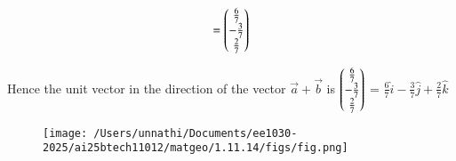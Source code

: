 \documentclass[journal]{IEEEtran}
\begin{document}
\begin{align}
= \myvec{\frac{6}{7} \\ -\frac{3}{7} \\ \frac{2}{7}}
\end{align}

Hence the unit vector in the direction of the vector $\vec{a} + \vec{b}$ is $\myvec{\frac{6}{7} \\ -\frac{3}{7} \\ \frac{2}{7}}$ = $\frac{6}{7}\hat{i} - \frac{3}{7}\hat{j} + \frac{2}{7}\hat{k}$ 

\begin{figure}[h!]
   \centering
   \texttt{[image: /Users/unnathi/Documents/ee1030-2025/ai25btech11012/matgeo/1.11.14/figs/fig.png]}
   \caption{}
   \label{stemplot}
\end{figure}
\end{document}

